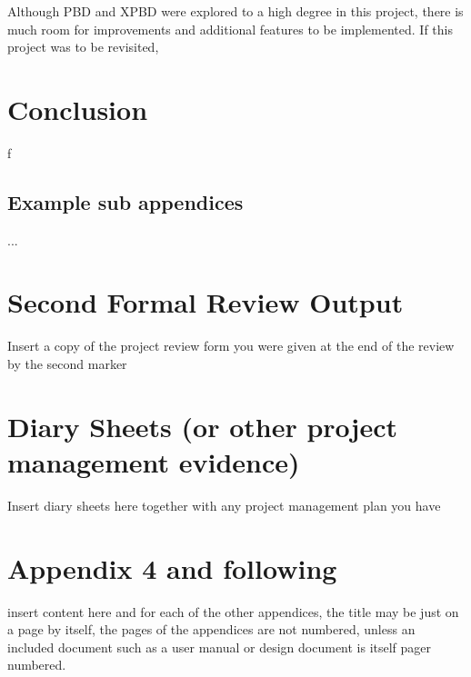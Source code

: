\documentclass[12pt,a4paper]{article}
\begin{document}
Although PBD and XPBD were explored to a high degree in this project, there is much room for improvements and additional features to be implemented. If this project was to be revisited, 

\section{Conclusion}
f



\newpage
\begin{appendices}
\begin{minipage}{\textwidth}
	
\end{minipage}

\begin{subappendices}

\subsection{Example sub appendices}
...
\end{subappendices}

\section{Second Formal Review Output}
Insert a copy of the project review form you were given at the end of the review by the second marker

\section{Diary Sheets (or other project management evidence)}
Insert diary sheets here together with any project management plan you have

\section{Appendix 4 and following}
insert content here and for each of the other appendices, the title may be just on a page by itself, the pages of the appendices are not numbered, unless an included document such as a user manual or design document is itself pager numbered.
\end{appendices}
\end{document}
